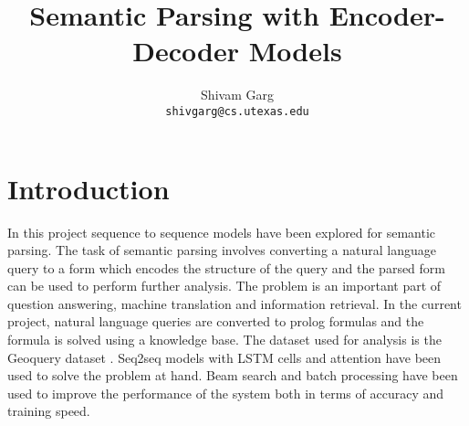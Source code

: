 \documentclass[11pt,a4paper]{article}
\title{Semantic Parsing with Encoder-Decoder Models}
\author{Shivam Garg \\
  \texttt{shivgarg@cs.utexas.edu} \\ }
\date{}
\begin{document}
\maketitle

\section{Introduction}
In this project sequence to sequence models have been explored for semantic parsing. The task of semantic parsing involves converting a natural language query to a form which encodes the structure of the query and the parsed form can be used to perform further analysis. The problem is an important part of question answering, machine translation and information retrieval. In the current project, natural language queries are converted to prolog  formulas and the formula is solved using a knowledge base. The dataset used for analysis is the Geoquery dataset \cite{zelle1996learning}. Seq2seq models with LSTM cells and attention have been used to solve the problem at hand. Beam search and batch processing have been used to improve the performance of the system both in terms of accuracy and training speed.
\end{document}
